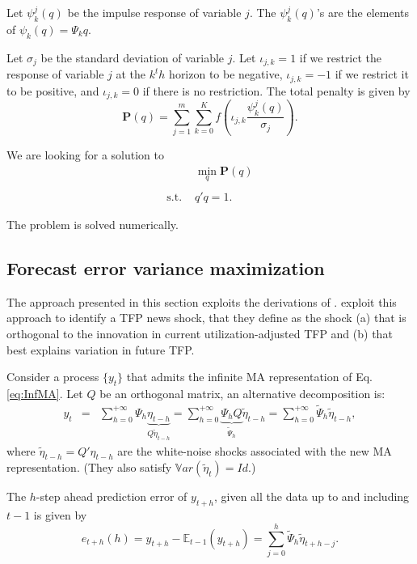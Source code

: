 \documentclass[
  12pt,
]{book}
\theoremstyle{definition}
\theoremstyle{definition}
\theoremstyle{definition}
\theoremstyle{definition}
\theoremstyle{remark}
\begin{document}
Let \(\psi_k^j(q)\) be the impulse response of variable \(j\). The \(\psi_k^j(q)\)'s are the elements of \(\psi_k(q)=\Psi_kq\).

Let \(\sigma_j\) be the standard deviation of variable \(j\). Let \(\iota_{j,k}=1\) if we restrict the response of variable \(j\) at the \(k^th\) horizon to be negative, \(\iota_{j,k}=-1\) if we restrict it to be positive, and \(\iota_{j,k}=0\) if there is no restriction. The total penalty is given by \[
\mathbf{P}(q)=\sum_{j=1}^m\sum_{k=0}^Kf\left(\iota_{j,k}\frac{\psi_k^j(q)}{\sigma_j}\right).
\]

We are looking for a solution to
\[\begin{array}{ll}&\min_q \mathbf{P}(q)\\
&\\
\text{s.t. }&q'q=1.\end{array}\]

The problem is solved numerically.

\hypertarget{forecast-error-variance-maximization}{%
\subsection{Forecast error variance maximization}\label{forecast-error-variance-maximization}}

The approach presented in this section exploits the derivations of \citet{Uhlig_2004}. \citet{BARSKY2011273} exploit this approach to identify a TFP news shock, that they define as the shock (a) that is orthogonal to the innovation in current utilization-adjusted TFP and (b) that best explains variation in future TFP.

Consider a process \(\{y_t\}\) that admits the infinite MA representation of Eq. \eqref{eq:InfMA}. Let \(Q\) be an orthogonal matrix, an alternative decomposition is:
\begin{eqnarray}
y_t&=&\sum_{h=0}^{+\infty}\Psi_h\underbrace{\eta_{t-h}}_{Q\tilde \eta_{t-h}} = \sum_{h=0}^{+\infty}\underbrace{\Psi_hQ}_{\tilde\Psi_h}\tilde
\eta_{t-h} = \sum_{h=0}^{+\infty}\tilde\Psi_h\tilde \eta_{t-h},
\end{eqnarray}
where \(\tilde \eta_{t-h}=Q'\eta_{t-h}\) are the white-noise shocks associated with the new MA representation. (They also satisfy \(\mathbb{V}ar(\tilde\eta_t)=Id\).)

The \(h\)-step ahead prediction error of \(y_{t+h}\), given all the data up to and including \(t-1\) is given by
\[
e_{t+h}(h)=y_{t+h}-\mathbb{E}_{t-1}(y_{t+h})=\sum_{j=0}^h\tilde \Psi_h\tilde \eta_{t+h-j}.
\]
\end{document}
